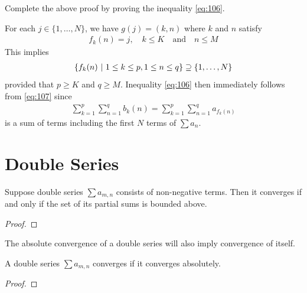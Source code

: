 \documentclass[thmcnt=section, 12pt]{my-elegantbook}
\begin{document}
\begin{exercise}
    Complete the above proof by proving the inequality \eqref{eq:106}.
    \label{ex:5}
\end{exercise}

\begin{solution}
    For each $j \in \{1, \ldots, N\}$, we have $g(j) = (k, n)$ where $k$ and $n$ satisfy
    \begin{align*}
        f_k(n) = j,
        \quad k \leq K
        \quad \text{and} \quad
        n \leq M
    \end{align*}
    This implies
    \begin{align*}
        \left\{ f_k(n) \ \middle| \ 1 \leq k \leq p, 1 \leq n \leq q \right\}
        \supseteq \{1, \ldots, N\}
    \end{align*}
    provided that $p \geq K$ and $q \geq M$. Inequality \eqref{eq:106} then immediately follows from \eqref{eq:107} since
    \begin{align*}
        \sum_{k=1}^p \sum_{n=1}^q b_k(n)
        = \sum_{k=1}^p \sum_{n=1}^q a_{f_k(n)}
    \end{align*}
    is a sum of terms including the first $N$ terms of $\sum a_n$.
\end{solution}


\section{Double Series}


\begin{theorem} \label{thm:47}
    Suppose double series $\sum a_{m,n}$ consists of non-negative terms. Then it converges if and only if the set of its partial sums is bounded above.
\end{theorem}

\begin{proof}
\end{proof}


The absolute convergence of a double series will also imply convergence of itself.

\begin{theorem}
    A double series $\sum a_{m,n}$ converges if it converges absolutely.
\end{theorem}

\begin{proof}
\end{proof}
\end{document}

